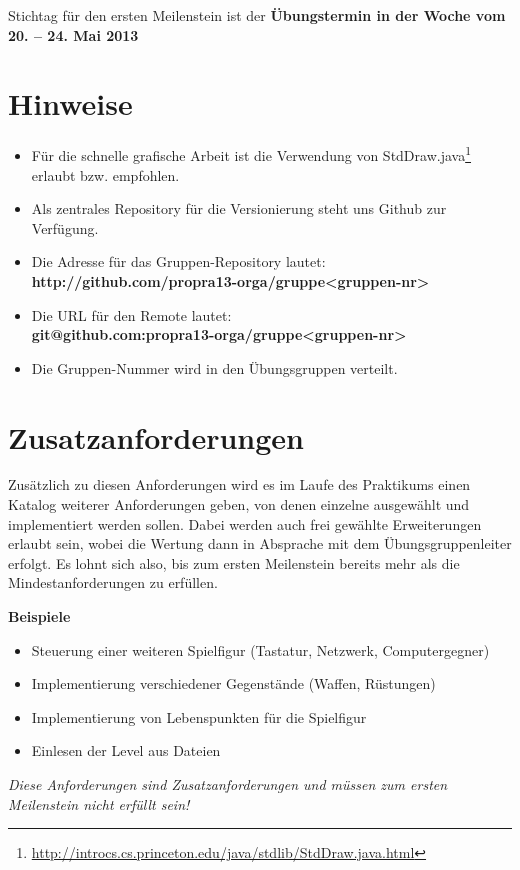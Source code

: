 \documentclass{programmierpraktikum}
\begin{document}
Stichtag für den ersten Meilenstein ist der \textbf{Übungstermin in der Woche vom 20. -- 24. Mai 2013}
%
\section{Hinweise}
\begin{itemize}
  \item Für die schnelle grafische Arbeit ist die Verwendung von
    StdDraw.java\footnote{\url{http://introcs.cs.princeton.edu/java/stdlib/StdDraw.java.html}} erlaubt
    bzw. empfohlen.
  \item Als zentrales Repository für die Versionierung steht uns Github zur Verfügung.
  \item Die Adresse für das Gruppen-Repository lautet:\\
    \textbf{http://github.com/propra13-orga/gruppe<gruppen-nr>}
  \item Die URL für den Remote lautet:\\
    \textbf{git@github.com:propra13-orga/gruppe<gruppen-nr>}
  \item Die Gruppen-Nummer wird in den Übungsgruppen verteilt.
\end{itemize}
%
\section{Zusatzanforderungen}
Zusätzlich zu diesen Anforderungen wird es im Laufe des Praktikums einen Katalog weiterer
Anforderungen geben, von denen einzelne ausgewählt und implementiert werden sollen. Dabei werden
auch frei gewählte Erweiterungen erlaubt sein, wobei die Wertung dann in Absprache mit dem
Übungsgruppenleiter erfolgt. Es lohnt sich also, bis zum ersten Meilenstein bereits mehr als die
Mindestanforderungen zu erfüllen.

\textbf{Beispiele}
\begin{itemize}
  \item Steuerung einer weiteren Spielfigur (Tastatur, Netzwerk, Computergegner)
  \item Implementierung verschiedener Gegenstände (Waffen, Rüstungen)
  \item Implementierung von Lebenspunkten für die Spielfigur
  \item Einlesen der Level aus Dateien
\end{itemize}
\emph{Diese Anforderungen sind Zusatzanforderungen und müssen zum ersten Meilenstein nicht erfüllt sein!}
%
\end{document}
